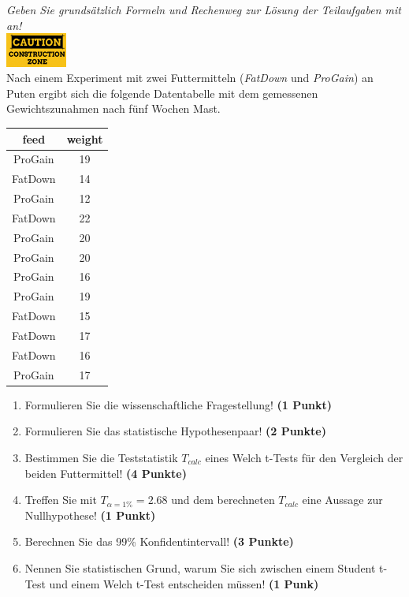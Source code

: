 \documentclass[a4paper, 10pt]{scrartcl}\usepackage[]{graphicx}\usepackage[]{xcolor}
\begin{document}
\textit{Geben Sie grunds{\"a}tzlich Formeln und Rechenweg zur L{\"o}sung der
  Teilaufgaben mit an!} \\[1Ex]

\hfill\href{foo}{\includegraphics[width =
  2cm]{img/caution}}\\[1Ex]

Nach einem Experiment mit zwei Futtermitteln (\textit{FatDown} und
\textit{ProGain}) an Puten ergibt sich die folgende Datentabelle mit dem gemessenen
Gewichtszunahmen nach f{\"u}nf Wochen Mast.

\begin{table}[!h]
\centering
\begin{tabular}{cc}
\toprule
feed & weight\\
\midrule
ProGain & 19\\
FatDown & 14\\
ProGain & 12\\
FatDown & 22\\
ProGain & 20\\
\addlinespace
ProGain & 20\\
ProGain & 16\\
ProGain & 19\\
FatDown & 15\\
FatDown & 17\\
\addlinespace
FatDown & 16\\
ProGain & 17\\
\bottomrule
\end{tabular}
\end{table}



\begin{enumerate}
  \item Formulieren Sie die wissenschaftliche Fragestellung! \textbf{(1 Punkt)}
  \item Formulieren Sie das statistische Hypothesenpaar! \textbf{(2
      Punkte)}
  \item Bestimmen Sie die Teststatistik $T_{calc}$ eines Welch t-Tests f{\"u}r den
  Vergleich der beiden Futtermittel! \textbf{(4 Punkte)}
\item Treffen Sie mit $T_{\alpha = 1\%} = 2.68$ und dem berechneten $T_{calc}$ eine Aussage
  zur Nullhypothese! \textbf{(1 Punkt)}
\item Berechnen Sie das 99\% Konfidentintervall! \textbf{(3 Punkte)}
\item Nennen Sie statistischen Grund, warum Sie sich zwischen einem Student t-Test und einem
  Welch t-Test entscheiden m{\"u}ssen! \textbf{(1 Punk)}
\end{enumerate} 
\clearpage
\end{document}
